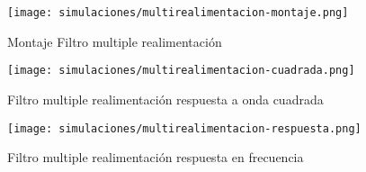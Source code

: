 \begin{figure}[ht]
    \centering
    \texttt{[image: simulaciones/multirealimentacion-montaje.png]}
    \caption{Montaje Filtro multiple realimentación}\label{fig:sim-multirealimentacion-montaje} 
\end{figure}
\begin{figure}[ht]
    \centering
    \texttt{[image: simulaciones/multirealimentacion-cuadrada.png]}
    \caption{Filtro multiple realimentación respuesta a onda cuadrada}
    \label{fig:sim-multirealimentacion-cuadrada} 
\end{figure}
\begin{figure}[ht]
    \centering
    \texttt{[image: simulaciones/multirealimentacion-respuesta.png]}
    \caption{Filtro multiple realimentación respuesta en frecuencia  }
    \label{fig:sim-multirealimentacion-respuesta} 
\end{figure}